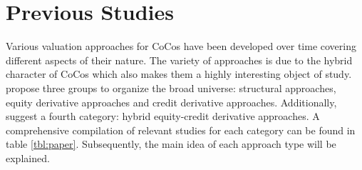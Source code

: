 

\section{Previous Studies}
Various valuation approaches for CoCos have been developed over time covering different aspects of their nature. The variety of approaches is due to the hybrid character of CoCos which also makes them a highly interesting object of study. \citet{wilkens2014contingent} propose three groups to organize the broad universe: structural approaches, equity derivative approaches and credit derivative approaches. Additionally, \citet{turfus2015cocos} suggest a fourth category: hybrid equity-credit derivative approaches. A comprehensive compilation of relevant studies for each category can be found in table \ref{tbl:paper}. Subsequently, the main idea of each approach type will be explained.


